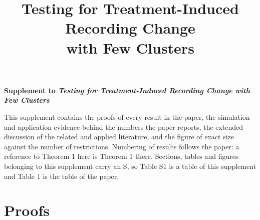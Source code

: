 \documentclass[12pt]{article}
\title{Testing for Treatment-Induced Recording Change\\[2pt]
with Few Clusters}
\author{}
\theoremstyle{definition}
\numberwithin{equation}{section}
\begin{document}
\begin{center}

{\large\bfseries Supplement to \emph{Testing for Treatment-Induced Recording Change with Few Clusters}}\\[8pt]



\end{center}

\vspace{6pt}

\noindent This supplement contains the proofs of every result in the paper, the simulation and application evidence behind the numbers the paper reports, the extended discussion of the related and applied literature, and the figure of exact size against the number of restrictions. Numbering of results follows the paper: a reference to Theorem 1 here is Theorem 1 there. Sections, tables and figures belonging to this supplement carry an S, so Table S1 is a table of this supplement and Table 1 is the table of the paper.

\vspace{10pt}

\setcounter{section}{0}

\renewcommand{\thesection}{S\arabic{section}}

\setcounter{table}{0}
\setcounter{figure}{0}
\renewcommand{\thetable}{S\arabic{table}}
\renewcommand{\thefigure}{S\arabic{figure}}


\section{Proofs}
\end{document}
